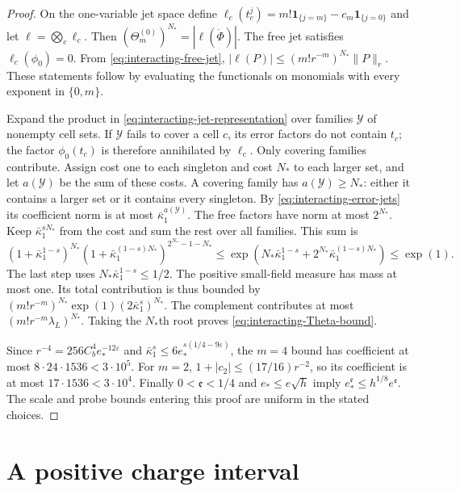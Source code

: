 \documentclass[11pt,letterpaper,reqno]{amsart}
\begin{document}
\begin{proof}
On the one-variable jet space define
$\ell_c(t_c^j)=m!\mathbf1_{\{j=m\}}-c_m\mathbf1_{\{j=0\}}$
and let $\ell=\bigotimes_c\ell_c$.
Then $(\Theta_m^{(0)})^{N_*}=|\ell(\mathring\Phi)|$.
The free jet satisfies $\ell_c(\phi_0)=0$.
From \eqref{eq:interacting-free-jet},
$|\ell(P)|\le(m!r^{-m})^{N_*}\|P\|_r$.
These statements follow by evaluating the
functionals on monomials with every exponent
in $\{0,m\}$.

Expand the product in
\eqref{eq:interacting-jet-representation} over
families $\mathcal Y$ of nonempty cell sets.
If $\mathcal Y$ fails to cover a cell $c$,
its error factors do not contain $t_c$;
the factor $\phi_0(t_c)$ is therefore
annihilated by $\ell_c$. Only covering
families contribute.
Assign cost one to each singleton and
cost $N_*$ to each larger set, and let
$a(\mathcal Y)$ be the sum of these costs.
A covering family has $a(\mathcal Y)\ge N_*$:
either it contains a larger set or it
contains every singleton.
By \eqref{eq:interacting-error-jets} its
coefficient norm is at most
$\bar\kappa_1^{a(\mathcal Y)}$.
The free factors have norm at most $2^{N_*}$.
Keep $\bar\kappa_1^{sN_*}$ from the cost
and sum the rest over all families. This
sum is
\[
 (1+\bar\kappa_1^{1-s})^{N_*}
  (1+\bar\kappa_1^{(1-s)N_*})^{2^{N_*}-1-N_*}
 \le\exp\left(N_*\bar\kappa_1^{1-s}
                  +2^{N_*}\bar\kappa_1^{(1-s)N_*}\right)
 \le\exp(1).
\]
The last step uses $N_*\bar\kappa_1^{1-s}\le1/2$.
The positive small-field measure has mass at
most one. Its total contribution is thus
bounded by
$(m!r^{-m})^{N_*}\exp(1)(2\bar\kappa_1^s)^{N_*}$.
The complement contributes at most
$(m!r^{-m}\lambda_L)^{N_*}$.
Taking the $N_*$th root proves
\eqref{eq:interacting-Theta-bound}.

Since $r^{-4}=256C_b^4e_*^{-12\varepsilon}$
and $\bar\kappa_1^s\le6e_*^{s(1/4-9\varepsilon)}$,
the $m=4$ bound has coefficient at most
$8\cdot24\cdot1536<3\cdot10^5$.
For $m=2$, $1+|c_2|\le(17/16)r^{-2}$,
so its coefficient is at most
$17\cdot1536<3\cdot10^4$.
Finally $0<\mathfrak e<1/4$ and
$e_*\le e\sqrt h$ imply
$e_*^{\mathfrak e}\le h^{1/8}e^{\mathfrak e}$.
The scale and probe bounds entering this
proof are uniform in the stated choices.
\end{proof}

\section{A positive charge interval}
\label{subsec:interacting-positive-threshold}
\end{document}
